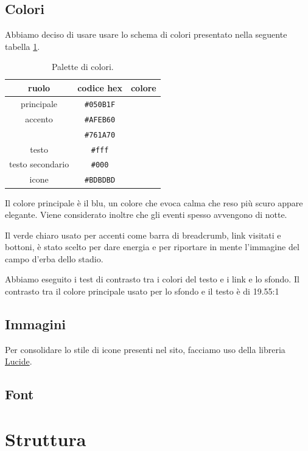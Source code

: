 \documentclass{article}
\begin{document}
\subsection{Colori}
Abbiamo deciso di usare usare lo schema di colori presentato nella seguente tabella \ref{table:2}.\par
\begin{table}[h!]
    \centering
    \begin{tabular}{|c|c|c|}
        \hline
        ruolo & codice hex & colore \\ \hline\hline
        principale & \verb|#050B1F| & \cellcolor[HTML]{050B1F} \\ \hline
        accento & \verb|#AFEB60| & \cellcolor[HTML]{AFEB60} \\ \hline
        & \verb|#761A70| & \cellcolor[HTML]{761A70} \\ \hline
        testo & \verb|#fff| & \\ \hline
        testo secondario & \verb|#000| & \cellcolor{black} \\ \hline
        icone & \verb|#BDBDBD| & \cellcolor[HTML]{BDBDBD} \\ \hline
    \end{tabular}
    \label{table:2}
    \caption{Palette di colori.}
\end{table}
Il colore principale è il blu, un colore che evoca calma che reso più scuro appare elegante. Viene considerato inoltre che gli eventi spesso avvengono di notte.\par
Il verde chiaro usato per accenti come barra di breadcrumb, link visitati e bottoni, è stato scelto per dare energia e per riportare in mente l'immagine del campo d'erba dello stadio.\par
Abbiamo eseguito i test di contrasto tra i colori del testo e i link e lo sfondo.
Il contrasto tra il colore principale usato per lo sfondo e il testo è di 19.55:1
\subsection{Immagini}
Per consolidare lo stile di icone presenti nel sito, facciamo uso della libreria \href{https://lucide.dev}{Lucide}.
\subsection{Font}
\section{Struttura}
\end{document}
